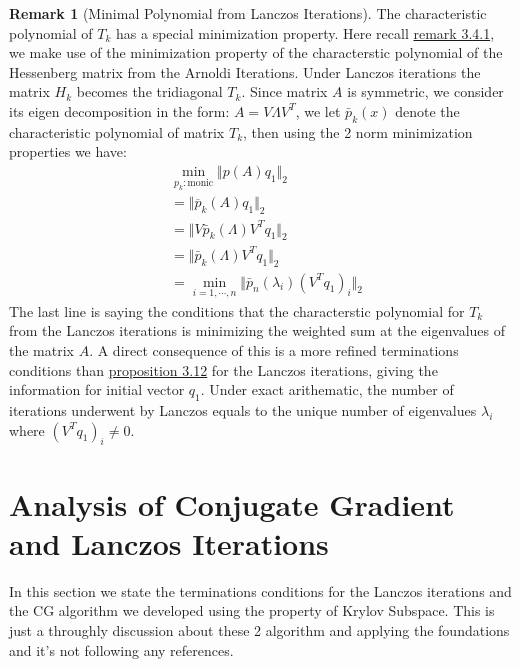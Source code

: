 \documentclass[]{article}
\theoremstyle{definition}
\newtheorem{remark}{Remark}[subsection]
\begin{document}
            \begin{remark}[Minimal Polynomial from Lanczos Iterations]\label{remark:Minimal_Polynomial_from_Lanczos_Iterations}
                The characteristic polynomial of $T_k$ has a special minimization property. Here recall \hyperref[remark:Arnoldi_Produces_Minimal_Monic_in_Krylov_Subspace]{remark 3.4.1}, we make use of the minimization property of the characterstic polynomial of the Hessenberg matrix from the Arnoldi Iterations. Under Lanczos iterations the matrix $H_k$ becomes the tridiagonal $T_k$. Since matrix $A$ is symmetric, we consider its eigen decomposition in the form: $A = V\Lambda V^T$, we let $\bar{p}_k(x)$ denote the characteristic polynomial of matrix $T_k$, then using the 2 norm minimization properties we have: 
                \begin{align}
                    & \min_{p_k:\text{monic}} \Vert p(A)q_1\Vert_2
                    \\
                    & =\Vert \overline{p}_k(A)q_1\Vert_2
                    \\
                    & = \Vert V \bar{p}_k(\Lambda)V^Tq_1\Vert_2
                    \\
                    & = \Vert \bar{p}_k(\Lambda)V^Tq_1\Vert_2
                    \\
                    &= \min_{i = 1, \cdots, n} \Vert \bar{p}_n(\lambda_i)(V^Tq_1)_i\Vert_2
                \end{align}
                The last line is saying the conditions that the characterstic polynomial for $T_k$ from the Lanczos iterations is minimizing the weighted sum at the eigenvalues of the matrix $A$. A direct consequence of this is a more refined terminations conditions than \hyperref[prop:Lanczos_Termination_Conditions]{proposition 3.12} for the Lanczos iterations, giving the information for initial vector $q_1$. Under exact arithematic, the number of iterations underwent by Lanczos equals to the unique number of eigenvalues $\lambda_i$ where $(V^Tq_1)_i \neq 0$. 
                
            \end{remark}
            
\section{Analysis of Conjugate Gradient and Lanczos Iterations}
    In this section we state the terminations conditions for the Lanczos iterations and the CG algorithm we developed using the property of Krylov Subspace. This is just a throughly discussion about these 2 algorithm and applying the foundations and it's not following any references. 
\end{document}
